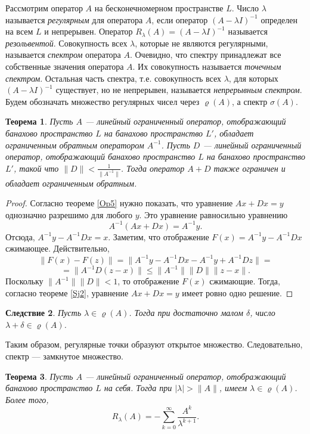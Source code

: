 \documentclass[12pt, titlepage, oneside]{amsbook}
\newtheorem{theorem}{Теорема}[chapter]
\newtheorem{corollary}[theorem]{Следствие}
\theoremstyle{definition}
\theoremstyle{remark}
\begin{document}
Рассмотрим оператор $A$ на бесконечномерном пространстве $L$. Число $\lambda$ называется \emph{регулярным} для оператора $A$, если оператор $(A-\lambda I)^{-1}$ определен на всем $L$ и непрерывен. Оператор $R_{\lambda}(A)=(A-\lambda I)^{-1}$ называется \emph{резольвентой}. Совокупность всех $\lambda$, которые не являются регулярными, называется \emph{спектром} оператора $A$. Очевидно, что спектру принадлежат все собственные значения оператора $A$. Их совокупность называется \emph{точечным спектром}. Остальная часть спектра, т.е. совокупность всех $\lambda$, для которых $(A-\lambda I)^{-1}$ существует, но не непрерывен, называется \emph{непрерывным спектром}. Будем обозначать множество регулярных чисел через $\varrho(A)$, а спектр $\sigma(A)$.

\begin{theorem}
\label{Sp1}
Пусть $A$  --- линейный ограниченный оператор, отображающий банахово пространство $L$ на банахово пространство $L'$, обладает ограниченным обратным оператором $A^{-1}$. Пусть $D$  --- линейный ограниченный оператор, отображающий банахово пространство $L$ на банахово пространство $L'$, такой что $\|D\|<\frac{1}{\|A^{-1}\|}$. Тогда оператор $A+D$ также ограничен и обладает ограниченным обратным.
\end{theorem}

\begin{proof}
Согласно теореме \ref{Op5} нужно показать, что уравнение $Ax+Dx=y$ однозначно разрешимо для любого $y$. Это уравнение равносильно уравнению $$A^{-1}(Ax+Dx)=A^{-1}y.$$ Отсюда, $A^{-1}y-A^{-1}Dx=x.$ Заметим, что отображение $F(x)=A^{-1}y-A^{-1}Dx$ сжимающее. Действительно, $$\|F(x)-F(z)\|=\|A^{-1}y-A^{-1}Dx-A^{-1}y+A^{-1}Dz\|=$$ $$=\|A^{-1}D(z-x)\|\leq\|A^{-1}\|\|D\|\|z-x\|.$$ Поскольку $\|A^{-1}\|\|D\|<1$, то отображение $F(x)$ сжимающие. Тогда, согласно теореме \ref{Sj2}, уравнение $Ax+Dx=y$ имеет ровно одно решение.
\end{proof}

\begin{corollary}
\label{Sp2}
Пусть $\lambda\in\varrho(A)$. Тогда при достаточно малом $\delta$, число $\lambda+\delta\in\varrho(A)$.
\end{corollary}

Таким образом, регулярные точки образуют открытое множество. Следовательно, спектр --- замкнутое множество.

\begin{theorem}
\label{Sp3}
Пусть $A$  --- линейный ограниченный оператор, отображающий банахово пространство $L$ на себя. Тогда при $|\lambda|>\|A\|$, имеем $\lambda\in\varrho(A)$. Более того, $$R_{\lambda}(A)=-\sum\limits_{k=0}^{\infty}\frac{A^k}{\lambda^{k+1}}.$$
\end{theorem}
\end{document}
